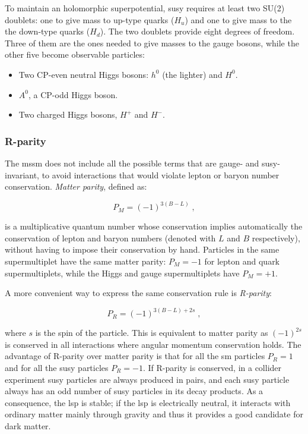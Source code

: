 To maintain an holomorphic superpotential, \gls{susy} requires at least two SU(2) doublets: one to give mass to up-type quarks ($H_u$) and one to give mass to the the down-type quarks ($H_d$). The two doublets provide eight degrees of freedom. Three of them are the ones needed to give masses to the gauge bosons, while the other five become observable particles:
\begin{itemize}
\item Two CP-even neutral Higgs bosons: $h^0$ (the lighter) and $H^0$.
\item $A^0$, a CP-odd Higgs boson.
\item Two charged Higgs bosons, $H^+$ and $H^-$.
\end{itemize}


\subsubsection*{R-parity}

The \gls{mssm} does not include all the possible terms that are gauge- and \gls{susy}-invariant, to avoid interactions that would violate lepton or baryon number conservation. \textit{Matter parity}, defined as:

\begin{equation}
P_M = (-1)^{3 (B-L)} \; ,
\label{eq:defmatterparity}
\end{equation}

\noindent is a multiplicative quantum number whose conservation implies automatically the conservation of lepton and baryon numbers (denoted with $L$ and $B$ respectively), without having to impose their conservation by hand. Particles in the same supermultiplet have the same matter parity: $P_M =-1$ for lepton and quark supermultiplets, while the Higgs and gauge supermultiplets have $P_M =+1$.

A more convenient way to express the same conservation rule is \textit{R-parity}:

\begin{equation}
P_R = (-1)^{3(B-L) + 2 s} \; ,
\label{eq:defRparity}
\end{equation}

\noindent where $s$ is the spin of the particle. This is equivalent to matter parity as $(-1)^{2s}$ is conserved in all interactions where angular momentum conservation holds. The advantage of R-parity over matter parity is that for all the \gls{sm} particles $P_R = 1$ and for all the \gls{susy} particles $P_R=-1$. If  R-parity is conserved, in a collider experiment \gls{susy} particles are always produced in pairs, and each \gls{susy} particle always has an odd number of \gls{susy} particles in its decay products. As a consequence, the \gls{lsp} is stable; if the \gls{lsp} is electrically neutral, it interacts with ordinary matter mainly through gravity and thus it provides a good candidate for dark matter.

